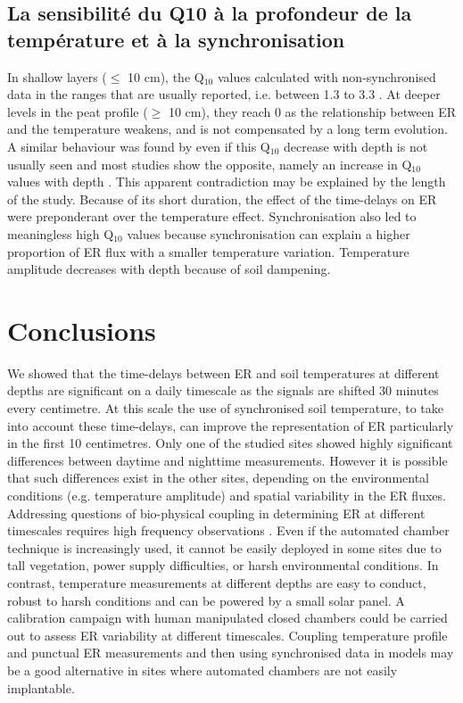 \subsection{La sensibilité du Q10 à la profondeur de la température et à la synchronisation}

In shallow layers ($\leq$ 10 cm), the Q$_{10}$ values calculated with non-synchronised data in the ranges that are usually reported, i.e. between 1.3 to 3.3 \citep{raich1992}.
At deeper levels in the peat profile ($\geq$ 10 cm), they reach 0 as the relationship between ER and the temperature weakens, and is not compensated by a long term evolution.
A similar behaviour was found by \citet{pavelka2007} even if this Q$_{10}$ decrease with depth is not usually seen and most studies show the opposite, namely an increase in Q$_{10}$ values with depth \citep{graf2008}.
This apparent contradiction may be explained by the length of the study.
Because of its short duration, the effect of the time-delays on ER were preponderant over the temperature effect.
Synchronisation also led to meaningless high Q$_{10}$ values because synchronisation can explain a higher proportion of ER flux with a smaller temperature variation.
Temperature amplitude decreases with depth because of soil dampening.


\section{Conclusions}  %

We showed that the time-delays between ER and soil temperatures at different depths are significant on a daily timescale as the signals are shifted 30 minutes every centimetre.
At this scale the  use of synchronised soil temperature, to take into account these time-delays, can improve the representation of ER particularly in the first 10 centimetres.
Only one of the studied sites showed highly significant differences between daytime and nighttime measurements.
However it is possible that such differences exist in the other sites, depending on the environmental conditions (e.g. temperature amplitude) and spatial variability in the ER fluxes.
Addressing questions of bio-physical coupling in determining ER at different timescales requires high frequency observations \citep{Vargas2011}.
Even if the automated chamber technique is increasingly used, it cannot be easily deployed in some sites due to tall vegetation, power supply difficulties, or harsh environmental conditions.
In contrast, temperature measurements at different depths are easy to conduct, robust to harsh conditions and can be powered by a small solar panel.
A calibration campaign with human manipulated closed chambers could be carried out to assess ER variability at different timescales.
Coupling temperature profile and punctual ER measurements and then using synchronised data in models may be a good alternative in sites where automated chambers are not easily implantable.